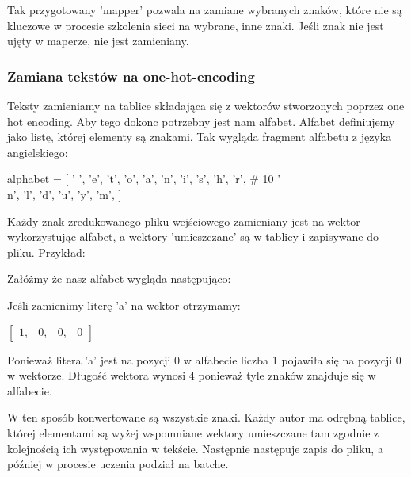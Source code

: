 Tak przygotowany 'mapper' pozwala na zamiane wybranych znaków, które nie są kluczowe w procesie 
szkolenia sieci na wybrane, inne znaki. Jeśli znak nie jest ujęty w maperze, nie jest zamieniany. 

\subsubsection{Zamiana tekstów na one-hot-encoding}
Teksty zamieniamy na tablice składająca się z wektorów stworzonych poprzez one hot encoding. 
Aby tego dokonc potrzebny jest nam alfabet. Alfabet definiujemy jako listę, której 
elementy są znakami. Tak wygląda fragment alfabetu z języka angielskiego:
\begin{python}
alphabet = [
    ' ',
    'e',
    't',
    'o',
    'a',
    'n',
    'i',
    's',
    'h',
    'r',  # 10
    '\\n',
    'l',
    'd',
    'u',
    'y',
    'm',
]
\end{python}

Każdy znak zredukowanego pliku wejściowego zamieniany jest na wektor wykorzystując alfabet, 
a wektory 'umieszczane' są w tablicy i zapisywane do pliku. Przykład:

Załóżmy że nasz alfabet wygląda następująco:

Jeśli zamienimy literę 'a' na wektor otrzymamy: 
 
\vspace{2mm}
$
\begin{bmatrix} 
1, & 0, & 0, & 0
\end{bmatrix} 
$
\vspace{2mm}

Ponieważ litera 'a' jest na pozycji 0 w alfabecie liczba 1 pojawiła się na pozycji 0 w wektorze.
Długość wektora wynosi 4 ponieważ tyle znaków znajduje się w alfabecie.

W ten sposób konwertowane są wszystkie znaki.
Każdy autor ma odrębną tablice, której elementami są wyżej wspomniane wektory umieszczane tam zgodnie 
z kolejnością ich występowania w tekście. 
Następnie następuje zapis do pliku, a później w procesie uczenia podział na batche.